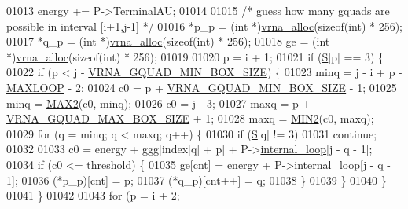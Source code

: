 \begin{DoxyCode}
01013     energy += P->\mbox{\hyperlink{group__energy__parameters_a0ad35507a03ba7f751e82cb375e991dd}{TerminalAU}};
01014 
01015   \textcolor{comment}{/* guess how many gquads are possible in interval [i+1,j-1] */}
01016   *p\_p  = (\textcolor{keywordtype}{int} *)\mbox{\hyperlink{group__utils_gaf37a0979367c977edfb9da6614eebe99}{vrna\_alloc}}(\textcolor{keyword}{sizeof}(\textcolor{keywordtype}{int}) * 256);
01017   *q\_p  = (\textcolor{keywordtype}{int} *)\mbox{\hyperlink{group__utils_gaf37a0979367c977edfb9da6614eebe99}{vrna\_alloc}}(\textcolor{keyword}{sizeof}(\textcolor{keywordtype}{int}) * 256);
01018   ge    = (\textcolor{keywordtype}{int} *)\mbox{\hyperlink{group__utils_gaf37a0979367c977edfb9da6614eebe99}{vrna\_alloc}}(\textcolor{keyword}{sizeof}(\textcolor{keywordtype}{int}) * 256);
01019 
01020   p = i + 1;
01021   \textcolor{keywordflow}{if} (\mbox{\hyperlink{group__energy__parameters__rw_gga7bf2bb363bcf5ce50d60255d256e5682af1ce01387d2348f8b858721a7db81670}{S}}[p] == 3) \{
01022     \textcolor{keywordflow}{if} (p < j - \mbox{\hyperlink{group__energy__parameters_gad7bdd880afca461f97763d79ee57a347}{VRNA\_GQUAD\_MIN\_BOX\_SIZE}}) \{
01023       minq  = j - i + p - \mbox{\hyperlink{energy__const_8h_ad1bd6eabac419670ddd3c9ed82145988}{MAXLOOP}} - 2;
01024       c0    = p + \mbox{\hyperlink{group__energy__parameters_gad7bdd880afca461f97763d79ee57a347}{VRNA\_GQUAD\_MIN\_BOX\_SIZE}} - 1;
01025       minq  = \mbox{\hyperlink{group__utils_ga33297b3679c713b0c4d897cd0fe3b122}{MAX2}}(c0, minq);
01026       c0    = j - 3;
01027       maxq  = p + \mbox{\hyperlink{group__energy__parameters_ga56cafabad2f8a7db83f2d5d3b0e8d313}{VRNA\_GQUAD\_MAX\_BOX\_SIZE}} + 1;
01028       maxq  = \mbox{\hyperlink{group__utils_gae0b9cd0ce090bd69b951aa73e8fa4f7d}{MIN2}}(c0, maxq);
01029       \textcolor{keywordflow}{for} (q = minq; q < maxq; q++) \{
01030         \textcolor{keywordflow}{if} (\mbox{\hyperlink{group__energy__parameters__rw_gga7bf2bb363bcf5ce50d60255d256e5682af1ce01387d2348f8b858721a7db81670}{S}}[q] != 3)
01031           \textcolor{keywordflow}{continue};
01032 
01033         c0 = energy + ggg[index[q] + p] + P->\mbox{\hyperlink{group__energy__parameters_a2a4fb2c65023ec371c9b96573da6d2fc}{internal\_loop}}[j - q - 1];
01034         \textcolor{keywordflow}{if} (c0 <= threshold) \{
01035           ge[cnt]       = energy + P->\mbox{\hyperlink{group__energy__parameters_a2a4fb2c65023ec371c9b96573da6d2fc}{internal\_loop}}[j - q - 1];
01036           (*p\_p)[cnt]   = p;
01037           (*q\_p)[cnt++] = q;
01038         \}
01039       \}
01040     \}
01041   \}
01042 
01043   \textcolor{keywordflow}{for} (p = i + 2;

\end{DoxyCode}
